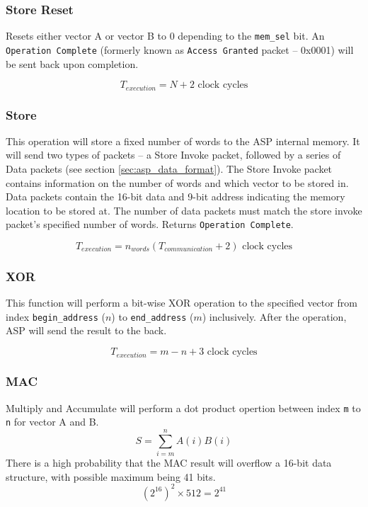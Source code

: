 \documentclass[]{article}
\begin{document}
	\subsubsection{Store Reset}
	Resets either vector A or vector B to 0 depending to the \texttt{mem\_sel} bit. An \texttt{Operation Complete} (formerly known as \texttt{Access Granted} packet -- 0x0001) will be sent back upon completion.
	
	$$T_{execution} = N + 2 \text{ clock cycles}$$
	
	\subsubsection{Store}
	This operation will store a fixed number of words to the ASP internal memory. It will send two types of packets -- a Store Invoke packet, followed by a series of Data packets (see section \ref{sec:asp_data_format}). The Store Invoke packet contains information on the number of words and which vector to be stored in. Data packets contain the 16-bit data and 9-bit address indicating the memory location to be stored at. The number of data packets must match the store invoke packet's specified number of words. Returns \texttt{Operation Complete}.
	
	$$T_{execution} = n_{words}(T_{communication} + 2) \text{ clock cycles}$$
	
	\subsubsection{XOR}
	This function will perform a bit-wise XOR operation to the specified vector from index \texttt{begin\_address} ($n$) to \texttt{end\_address} ($m$) inclusively. After the operation, ASP will send the result to the back.
	
	$$T_{execution} = m - n + 3 \text{ clock cycles}$$
	
	\subsubsection{MAC}
	Multiply and Accumulate will perform a dot product opertion between index \texttt{m} to \texttt{n} for vector A and B. 
	\begin{equation}
	S = \sum_{i=m}^{n}A(i)B(i)
	\end{equation}
	There is a high probability that the MAC result will overflow a 16-bit data structure, with possible maximum being 41 bits.
	\begin{equation}
	(2^{16})^2 \times 512 = 2^{41}
	\end{equation}
	
\end{document}
